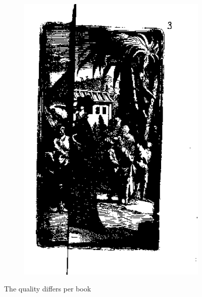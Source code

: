 \begin{figure}
\begin{subfigure}[b]{0.4\textwidth}
\includegraphics[width=\textwidth]{resources/bad_quality}
    \end{subfigure}
    \caption{The quality differs per book}
    \label{fig:qualityExamples}
\end{figure}




